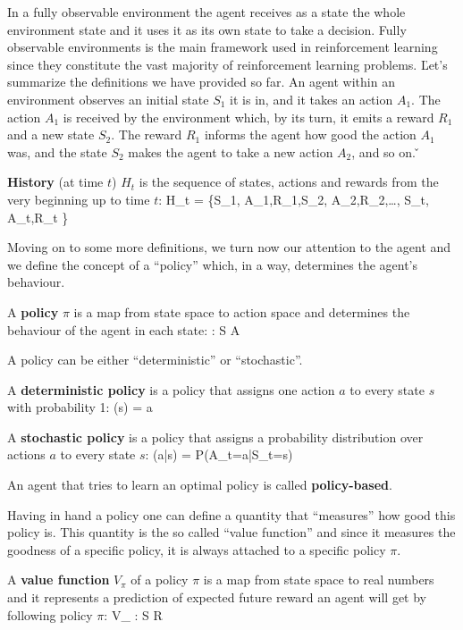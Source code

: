 In a fully observable environment the agent receives as a state the whole environment state and it uses it as its own
state to take a decision. Fully observable environments is the main framework used in reinforcement learning since 
they constitute the vast majority of reinforcement learning problems. \v

Let's summarize the definitions we have provided so far. An agent within an environment observes an initial state 
$S_1$ it is in, and it takes an action $A_1$. The action $A_1$ is received by the environment which, by its turn, it
emits a reward $R_1$ and a new state $S_2$. The reward $R_1$ informs the agent how good the action $A_1$ was, and 
the state $S_2$ makes the agent to take a new action $A_2$, and so on. \v


\bd[History]
\textbf{History} (at time $t$) $H_t$ is the sequence of states, actions and rewards from the very beginning up to 
time $t$:
\bse
H_t = \{S_1, A_1,R_1,S_2, A_2,R_2,\ldots, S_t, A_t,R_t \}
\ese
\ed

Moving on to some more definitions, we turn now our attention to the agent and we define the concept of a ``policy'' 
which, in a way, determines the agent's behaviour.

\bd[Policy]
A \textbf{policy} $\pi$ is a map from state space to action space and determines the behaviour of the agent in each
state:
\bse
\pi : S \to A
\ese
\ed

A policy can be either ``deterministic'' or ``stochastic''.

A \textbf{deterministic policy} is a policy that assigns one action $a$ to every state $s$ with probability 1:
\bse
\pi(s) = a
\ese
\ed

A \textbf{stochastic policy} is a policy that assigns a probability distribution over actions $a$ to every state $s$:
\bse
\pi(a|s) = P(A_t=a|S_t=s)
\ese
\ed

An agent that tries to learn an optimal policy is called \textbf{policy-based}.
\ed

Having in hand a policy one can define a quantity that ``measures'' how good this policy is. This quantity is the so 
called ``value function'' and since it measures the goodness of a specific policy, it is always attached to a 
specific policy $\pi$.

A \textbf{value function} $V_{\pi}$ of a policy $\pi$ is a map from state space to real numbers and it represents a 
prediction of expected future reward an agent will get by following policy $\pi$:
\bse
V_{\pi} : S \to R
\ese
\ed

